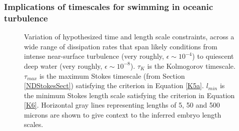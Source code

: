 \documentclass[10pt,a4paper]{article}
\def\l{\mathit{l}}
\begin{document}
\subsubsection{Implications of timescales for swimming in oceanic turbulence}\label{turb}
\begin{figure}[t] 
	\begin{center}
	\end{center}
	\caption{Variation of hypothesized time and length scale constraints, across a wide range of dissipation rates that span likely conditions from intense near-surface turbulence (very roughly, $\epsilon \sim 10^{-4}$) to quiescent deep water (very roughly, $\epsilon \sim 10^{-8}$). $\tau_K$ is the Kolmogorov timescale. $\tau_{max}$ is the maximum Stokes timescale (from Section \ref{NDStokesSect}) satisfying the criterion in Equation \ref{K5a}. $\l_{min}$ is the minimum Stokes length scale satisfying the criterion in Equation \ref{K6}. Horizontal gray lines representing lengths of 5, 50 and 500 microns are shown to give context to the inferred embryo length scales. 
	} \label{fig:Kol}
\end{figure}
\end{document}

